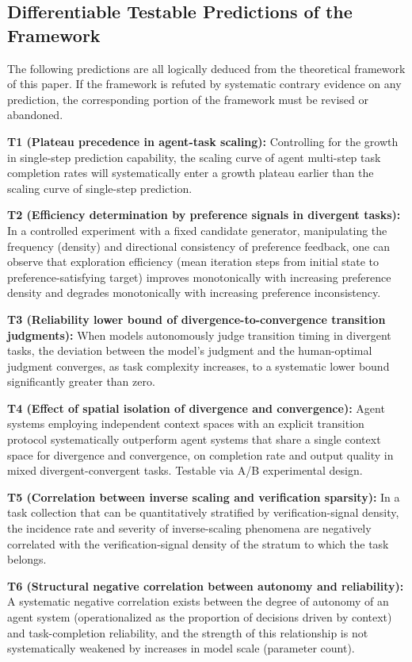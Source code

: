 \documentclass[11pt,a4paper]{article}
\theoremstyle{definition}
\begin{document}
\subsection{Differentiable Testable Predictions of the Framework}

The following predictions are all logically deduced from the theoretical framework of this paper. If the framework is refuted by systematic contrary evidence on any prediction, the corresponding portion of the framework must be revised or abandoned.

\textbf{T1 (Plateau precedence in agent-task scaling):} Controlling for the growth in single-step prediction capability, the scaling curve of agent multi-step task completion rates will systematically enter a growth plateau earlier than the scaling curve of single-step prediction.

\textbf{T2 (Efficiency determination by preference signals in divergent tasks):} In a controlled experiment with a fixed candidate generator, manipulating the frequency (density) and directional consistency of preference feedback, one can observe that exploration efficiency (mean iteration steps from initial state to preference-satisfying target) improves monotonically with increasing preference density and degrades monotonically with increasing preference inconsistency.

\textbf{T3 (Reliability lower bound of divergence-to-convergence transition judgments):} When models autonomously judge transition timing in divergent tasks, the deviation between the model's judgment and the human-optimal judgment converges, as task complexity increases, to a systematic lower bound significantly greater than zero.

\textbf{T4 (Effect of spatial isolation of divergence and convergence):} Agent systems employing independent context spaces with an explicit transition protocol systematically outperform agent systems that share a single context space for divergence and convergence, on completion rate and output quality in mixed divergent-convergent tasks. Testable via A/B experimental design.

\textbf{T5 (Correlation between inverse scaling and verification sparsity):} In a task collection that can be quantitatively stratified by verification-signal density, the incidence rate and severity of inverse-scaling phenomena are negatively correlated with the verification-signal density of the stratum to which the task belongs.

\textbf{T6 (Structural negative correlation between autonomy and reliability):} A systematic negative correlation exists between the degree of autonomy of an agent system (operationalized as the proportion of decisions driven by context) and task-completion reliability, and the strength of this relationship is not systematically weakened by increases in model scale (parameter count).
\end{document}
